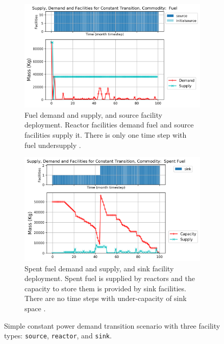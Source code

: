     \begin{figure}[]
        \centering
        \begin{subfigure}[t]{1\textwidth}
            \centering
            \includegraphics[width=0.9\linewidth]{figures/constanttransition-fuel.png} 
            \caption{Fuel demand and supply, and source facility deployment.
            Reactor facilities demand fuel and source facilities supply it.
            There is only one time step with fuel undersupply \cite{chee_arfc/transition-scenarios_2018}.}
            \label{fig:constanttransition-fuel}
        \end{subfigure}
        \begin{subfigure}[t]{1\textwidth}
            \centering
            \includegraphics[width=0.9\linewidth]{figures/constanttransition-spentfuel.png} 
            \caption{Spent fuel demand and supply, and sink facility deployment.
                Spent fuel is supplied by reactors and the capacity to store them 
                is provided by sink facilities.
            There are no time steps with under-capacity of sink space \cite{chee_arfc/transition-scenarios_2018}.}
            \label{fig:constanttransition-spentfuel}
        \end{subfigure}
        \caption{Simple constant power demand transition scenario with 
        three facility types: \texttt{source}, \texttt{reactor}, and \texttt{sink}.}
    \end{figure}

